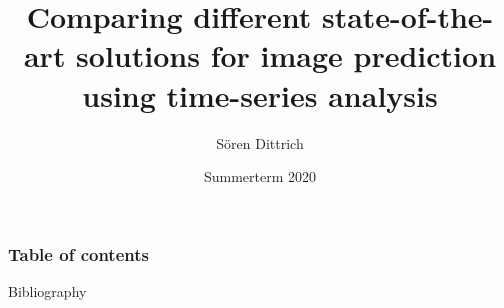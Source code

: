 \documentclass[10pt, a4paper]{beamer}
\title[Bachelorthesis Colloqium]{Comparing different state-of-the-art solutions for image prediction using time-series analysis}
\author{Sören Dittrich} %
\institute[] %
{
University of Hildesheim \\ %
}
\date{Summerterm 2020} %
\begin{document}
 \begin{frame}
 \titlepage %
 \end{frame}
 \begin{frame}
 \frametitle{Table of contents} %
 \tableofcontents %
 \end{frame}


 

 
 
 

 
 
 
 
% 
 
 
 
 
 
 
 
 \begin{frame}{Bibliography}
 
 
 \end{frame}
\end{document}
